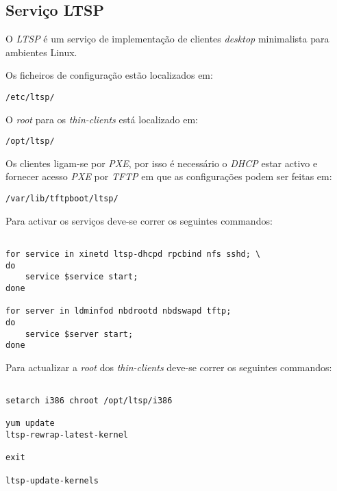 \subsection{Serviço LTSP}

O \emph{LTSP} é um serviço de implementação de clientes \emph{desktop} minimalista para ambientes Linux.


Os ficheiros de configuração estão localizados em:

\begin{Verbatim}[commandchars=\\\{\}]
/etc/ltsp/
\end{Verbatim}

O \emph{root} para os \emph{thin-clients} está localizado em:

\begin{Verbatim}[commandchars=\\\{\}]
/opt/ltsp/
\end{Verbatim}

Os clientes ligam-se por \emph{PXE}, por isso é necessário o \emph{DHCP} estar activo e fornecer acesso \emph{PXE} por \emph{TFTP} em que as configurações podem ser feitas em:

\begin{Verbatim}[commandchars=\\\{\}]
/var/lib/tftpboot/ltsp/
\end{Verbatim}

Para activar os serviços deve-se correr os seguintes commandos:
\begin{Verbatim}[commandchars=\\\{\}]

for service in xinetd ltsp-dhcpd rpcbind nfs sshd; \
do
    service $service start;
done

for server in ldminfod nbdrootd nbdswapd tftp;
do
    service $server start;
done

\end{Verbatim}

Para actualizar a \emph{root} dos \emph{thin-clients} deve-se correr os seguintes commandos:

\begin{Verbatim}[commandchars=\\\{\}]

setarch i386 chroot /opt/ltsp/i386

yum update
ltsp-rewrap-latest-kernel

exit

ltsp-update-kernels

\end{Verbatim}

